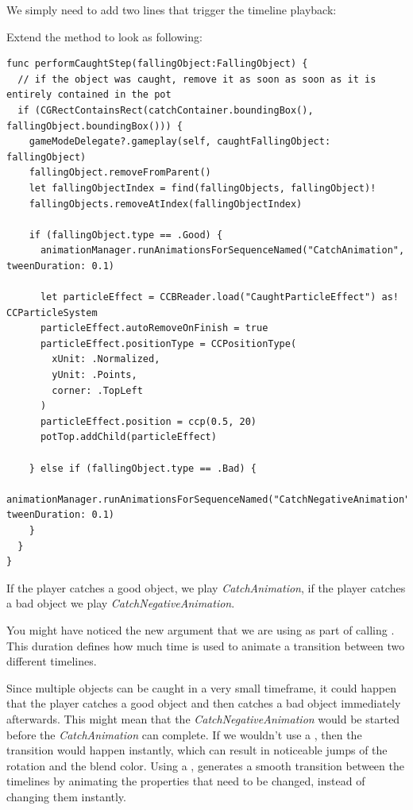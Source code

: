We simply need to add two lines that trigger the timeline playback:
\begin{leftbar}
Extend the  method to look as
following:
\begin{lstlisting}
func performCaughtStep(fallingObject:FallingObject) {
  // if the object was caught, remove it as soon as soon as it is entirely contained in the pot
  if (CGRectContainsRect(catchContainer.boundingBox(), fallingObject.boundingBox())) {
    gameModeDelegate?.gameplay(self, caughtFallingObject: fallingObject)
    fallingObject.removeFromParent()
    let fallingObjectIndex = find(fallingObjects, fallingObject)!
    fallingObjects.removeAtIndex(fallingObjectIndex)
    
    if (fallingObject.type == .Good) {
      animationManager.runAnimationsForSequenceNamed("CatchAnimation", tweenDuration: 0.1)
      
      let particleEffect = CCBReader.load("CaughtParticleEffect") as! CCParticleSystem
      particleEffect.autoRemoveOnFinish = true
      particleEffect.positionType = CCPositionType(
        xUnit: .Normalized,
        yUnit: .Points,
        corner: .TopLeft
      )
      particleEffect.position = ccp(0.5, 20)
      potTop.addChild(particleEffect)
      
    } else if (fallingObject.type == .Bad) {
      animationManager.runAnimationsForSequenceNamed("CatchNegativeAnimation", tweenDuration: 0.1)
    }
  }
}
\end{lstlisting}
\end{leftbar}

If the player catches a good object, we play \textit{CatchAnimation}, if the
player catches a bad object we play \textit{CatchNegativeAnimation}.

You might have noticed the new  argument that we are
using as part of calling . This
duration defines how much time is used to animate a transition between two
different timelines.

Since multiple objects can be caught in a very small timeframe, it could happen
that the player catches a good object and then catches a bad object immediately
afterwards. This might mean that the \textit{CatchNegativeAnimation} would be
started before the \textit{CatchAnimation} can complete. If we wouldn't use a
, then the transition would happen instantly, which
can result in noticeable jumps of the rotation and the blend color. Using a
, \cocos{} generates a smooth transition between the 
timelines by animating the properties that need to be changed, instead of changing 
them instantly.


